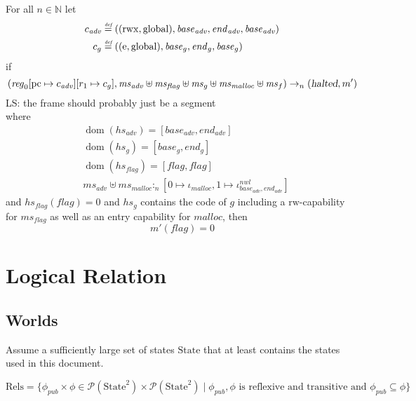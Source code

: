 \documentclass[a4paper]{article}
\newcommand{\forcenewline}{$\phantom{v}$\\}
\newcommand{\update}[2]{[#1 \mapsto #2]}
\newcommand{\defeq}{\stackrel{\textit{\tiny{def}}}{=}}
\DeclareMathOperator{\dom}{dom}
\newcommand{\powerset}[1]{\mathcal{P}(#1)}
\newcommand\lau[1]{{\color{purple} \sf \footnotesize {LS: #1}}\\}
\newcommand{\var}[1]{\mathit{#1}}
\newcommand{\hs}{\var{ms}}
\newcommand{\ms}{\hs}
\newcommand{\pcreg}{\mathrm{pc}}
\newcommand{\start}{\var{base}}
\newcommand{\addrend}{\var{end}}
\newcommand{\reg}{\var{reg}}
\newcommand{\heap}{\var{mem}}
\newcommand{\adv}{\var{adv}}
\newcommand{\flag}{\var{flag}}
\newcommand{\halted}{\textsl{halted}}
\newcommand{\pub}{\var{pub}}
\newcommand{\heapSat}[3][\heap]{#1 :_{#2} #3}
\newcommand{\codelabel}[1]{\mathit{#1}}
\newcommand{\malloc}{\codelabel{malloc}}
\newcommand{\plaindom}[1]{\mathrm{#1}}
\newcommand{\nats}{\mathbb{N}}
\newcommand{\Rels}{\plaindom{Rels}}
\newcommand{\States}{\plaindom{State}}
\newcommand{\plainperm}[1]{\mathrm{#1}}
\newcommand{\readwrite}{\plainperm{rw}}
\newcommand{\entry}{\plainperm{e}}
\newcommand{\rwx}{\plainperm{rwx}}
\newcommand{\glob}{\plainperm{global}}
\newcommand{\step}[1][]{\rightarrow_{#1}}
\begin{document}
\begin{lemma}\forcenewline
  For all $n \in \nats$
  let
  \begin{align*}
    c_{\var{adv}} & \defeq ((\rwx,\glob),\start_{\adv},\addrend_{\adv},\start_{\adv}) \\
    c_{g} & \defeq ((\entry,\glob),\start_g,\addrend_g,\start_g)
  \end{align*}
  if
  \[
    (\reg_0\update{\pcreg}{c_{\adv}}
    \update{r_1}{c_g},\hs_{\adv} \uplus \hs_{\flag} \uplus \hs_{g} \uplus \hs_{\malloc} \uplus \ms_f) \step[n] (\halted,m')
  \]
  \lau{the frame should probably just be a segment}
  where 
  \begin{align*}
    &\dom(hs_{\adv}) = [\start_\adv,\addrend_\adv] \\
    &\dom(hs_g) = [\start_g,\addrend_g] \\
    &\dom(hs_\flag) = [\flag,\flag] \\
    &\heapSat[\hs_{\adv} \uplus \hs_{\malloc}]{n}{[0 \mapsto \iota_{\malloc}, 1 \mapsto\iota^{\var{nwl}}_{\start_\adv,\addrend_\adv}]}
  \end{align*}
  and $hs_\flag(\flag) = 0$ and $hs_g$ contains the code of $g$ including a $\readwrite$-capability for $\hs_\flag$ as well as an entry capability for $\malloc$, 
  then
  \[
    m'(\flag) = 0
  \]
\end{lemma}


\section{Logical Relation}
\subsection{Worlds}
Assume a sufficiently large set of states $\States$ that at least contains the states used in this document.
\begin{definition}
  \[
   \Rels = \{\phi_\pub \times \phi \in \powerset{\States^2}\times \powerset{\States^2} \mid \phi_\pub, \phi \text{ is reflexive and transitive and } \phi_\pub \subseteq \phi \}
  \]
\end{definition}
\end{document}
